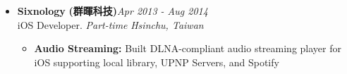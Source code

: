 \begin{itemize}[leftmargin=0pt, label={}]
\item{
{\sectionheading\large{\textbf{Sixnology}}} \textbf{(群暉科技)}\hfill {\sectionheading\small{\textit{Apr 2013 - Aug 2014}}}\\
{\sectionheading\small{iOS Developer. \textit{Part-time}}}\hfill
{\sectionheading\small{\textit{Hsinchu, Taiwan}}}

    \vspace{-6pt}
    \begin{itemize}[label=\textbullet, leftmargin=*, noitemsep]%
        \item{\textbf{Audio Streaming:} Built DLNA-compliant audio streaming player for iOS supporting local library, UPNP Servers, and Spotify}
    \end{itemize}
}

\end{itemize}